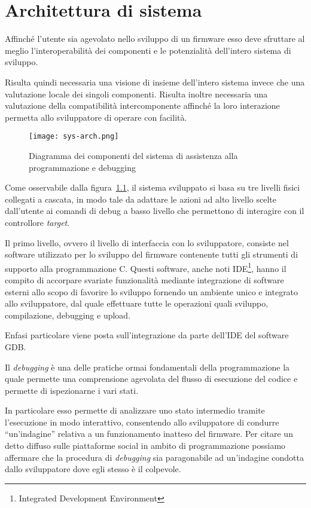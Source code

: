 \chapter{Architettura di sistema}

Affinché l'utente sia agevolato nello sviluppo di un firmware esso deve sfruttare al meglio l'interoperabilità dei componenti e le potenzialità dell'intero sistema di sviluppo.

Risulta quindi necessaria una visione di insieme dell'intero sistema invece che una valutazione locale dei singoli componenti. Risulta inoltre necessaria una valutazione della compatibilità intercomponente affinché la loro interazione permetta allo sviluppatore di operare con facilità.

\begin{figure}[t]
    \centering
    \texttt{[image: sys-arch.png]}
    \caption[]{Diagramma dei componenti del sistema di assistenza alla programmazione e debugging}\label{fig:sys-arch}
\end{figure}

Come osservabile dalla figura~\ref{fig:sys-arch}, il sistema sviluppato si basa su tre livelli fisici collegati a cascata, in modo tale da adattare le azioni ad alto livello scelte dall'utente ai comandi di debug a basso livello che permettono di interagire con il controllore \textit{target}. 

Il primo livello, ovvero il livello di interfaccia con lo sviluppatore, consiste nel software utilizzato per lo sviluppo del firmware contenente tutti gli strumenti di supporto alla programmazione C. Questi software, anche noti IDE\footnote{Integrated Development Environment}, hanno il compito di accorpare svariate funzionalità mediante integrazione di software esterni allo scopo di favorire lo sviluppo fornendo un ambiente unico e integrato allo sviluppatore, dal quale effettuare tutte le operazioni quali sviluppo, compilazione, debugging e upload.

Enfasi particolare viene posta sull'integrazione da parte dell'IDE del software GDB.\@

Il \textit{debugging} è una delle pratiche ormai fondamentali della programmazione la quale permette una comprensione agevolata del flusso di esecuzione del codice e permette di ispezionarne i vari stati.

In particolare esso permette di analizzare uno stato intermedio tramite l'esecuzione in modo interattivo, consentendo allo sviluppatore di condurre ``un'indagine'' relativa a un funzionamento inatteso del firmware. Per citare un detto diffuso sulle piattaforme social in ambito di programmazione possiamo affermare che la procedura di \textit{debugging} sia paragonabile ad un'indagine condotta dallo sviluppatore dove egli stesso è il colpevole.

